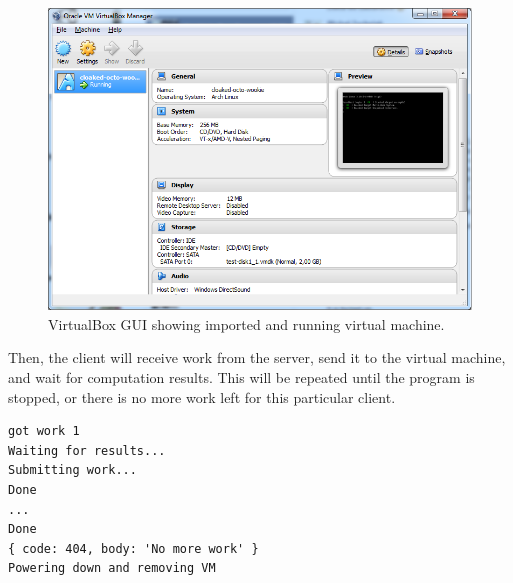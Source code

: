 \begin{figure}
\centering
\includegraphics[width=\textwidth]{images/virtualbox.png}
\caption{VirtualBox GUI showing imported and running virtual machine.}
\label{f:vboxgui}
\end{figure}

Then, the client will receive work from the server, send it to the virtual machine, and wait for computation results. This will be repeated until the program is stopped, or there is no more work left for this particular client.

\begin{lstlisting}[caption=Standard output of client application.]
got work 1
Waiting for results...
Submitting work...
Done
...
Done
{ code: 404, body: 'No more work' }
Powering down and removing VM
\end{lstlisting}